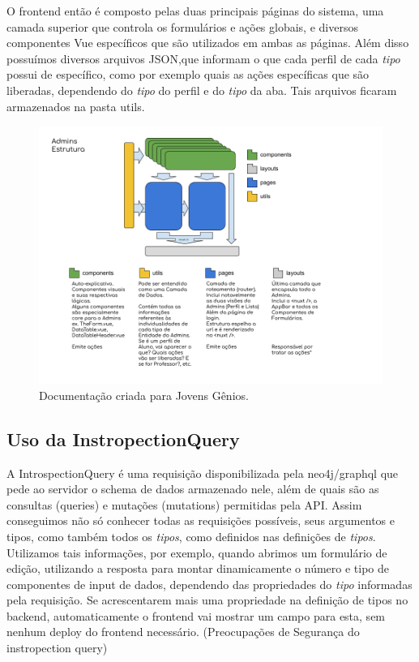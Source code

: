 O frontend então é composto pelas duas principais páginas do sistema, uma camada superior que controla os formulários e ações globais, e diversos componentes Vue específicos que são utilizados em ambas as páginas. Além disso possuímos diversos arquivos JSON,que informam o que cada perfil de cada \textit{tipo} possui de específico, como por exemplo quais as ações específicas que são liberadas, dependendo do \textit{tipo} do perfil e do \textit{tipo} da aba. Tais arquivos ficaram armazenados na pasta utils.

\begin{figure}[H]
    \centering
    \includegraphics[width=1.0\linewidth]{Imagens/chap04/front-estrutura.png}
    \caption{Documentação criada para Jovens Gênios.}
    \label{fig:front-estrutura}
\end{figure}
    
\subsection{Uso da InstropectionQuery}

A IntrospectionQuery é uma requisição disponibilizada pela neo4j/graphql que pede ao servidor o schema de dados armazenado nele, além de quais são as consultas (queries) e mutações (mutations) permitidas pela API. Assim conseguimos não só conhecer todas as requisições possíveis, seus argumentos e tipos, como também todos os \textit{tipos}, como definidos nas definições de \textit{tipos}. Utilizamos tais informações, por exemplo, quando abrimos um formulário de edição, utilizando a resposta para montar dinamicamente o número e tipo de componentes de input de dados, dependendo das propriedades do \textit{tipo} informadas pela requisição. Se acrescentarem mais uma propriedade na definição de tipos no backend, automaticamente o frontend vai mostrar um campo para esta, sem nenhum deploy do frontend necessário.
(Preocupações de Segurança do instropection query)

